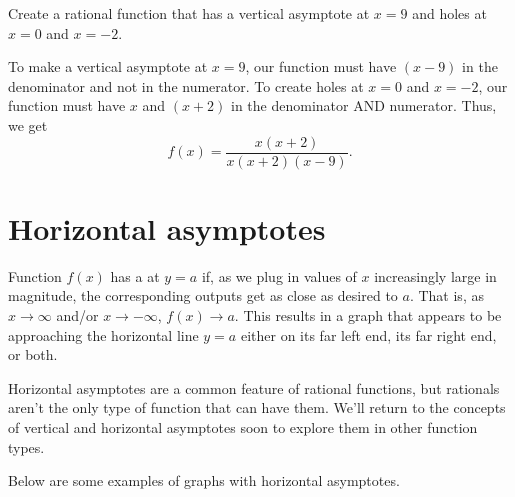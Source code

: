 \documentclass{ximera}
\begin{document}
\begin{example} 
Create a rational function that has a vertical asymptote at $x=9$ and holes at $x=0$ and $x=-2$.
\begin{explanation}
To make a vertical asymptote at $x=9$, our function must have $(x-9)$ in the denominator and not in the numerator. To create holes at $x=0$ and $x=-2$, our function must have $x$ and $(x+2)$ in the denominator AND numerator. Thus, we get
$$f(x)=\dfrac{x(x+2)}{x(x+2)(x-9)}.$$
\end{explanation}
\end{example}

\section{Horizontal asymptotes}
\begin{definition}
Function $f(x)$ has a  at $y=a$ if, as we plug in values of $x$ increasingly large in magnitude, the corresponding outputs get as close as desired to $a$. That is, as $x\rightarrow\infty$ and/or $x\rightarrow -\infty$, $f(x)\rightarrow a$. This results in a graph that appears to be approaching the horizontal line $y=a$ either on its far left end, its far right end, or both.
\end{definition}

Horizontal asymptotes are a common feature of rational functions, but rationals aren't the only type of function that can have them. We'll return to the concepts of vertical and horizontal asymptotes soon to explore them in other function types.

Below are some examples of graphs with horizontal asymptotes.

 \hfill
{}\hfill
{}
\vspace{-.1in}
\end{document}
